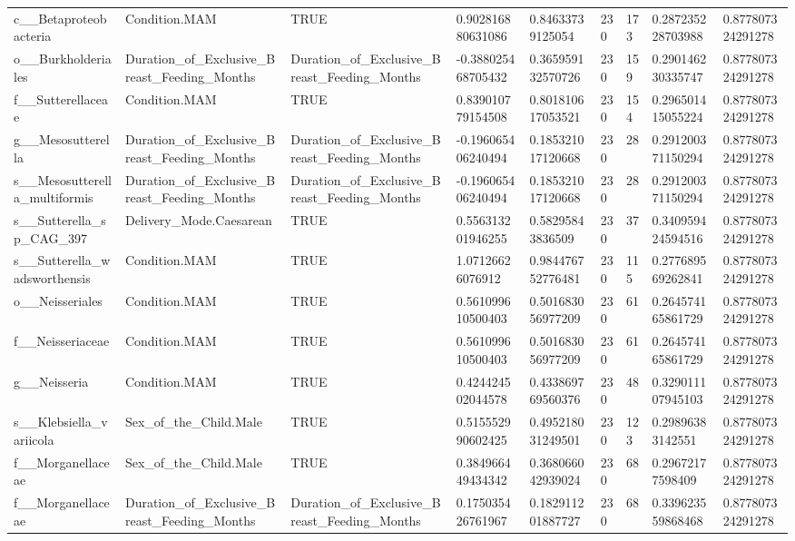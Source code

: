 \begin{longtable}{lllllllll}
c\_\_Betaproteobacteria & Condition.MAM & TRUE & 0.902816880631086 & 0.84633739125054 & 230 & 173 & 0.287235228703988 & 0.877807324291278 \\
o\_\_Burkholderiales & Duration\_of\_Exclusive\_Breast\_Feeding\_Months & Duration\_of\_Exclusive\_Breast\_Feeding\_Months & -0.388025468705432 & 0.365959132570726 & 230 & 159 & 0.290146230335747 & 0.877807324291278 \\
f\_\_Sutterellaceae & Condition.MAM & TRUE & 0.839010779154508 & 0.801810617053521 & 230 & 154 & 0.296501415055224 & 0.877807324291278 \\
g\_\_Mesosutterella & Duration\_of\_Exclusive\_Breast\_Feeding\_Months & Duration\_of\_Exclusive\_Breast\_Feeding\_Months & -0.196065406240494 & 0.185321017120668 & 230 & 28 & 0.291200371150294 & 0.877807324291278 \\
s\_\_Mesosutterella\_multiformis & Duration\_of\_Exclusive\_Breast\_Feeding\_Months & Duration\_of\_Exclusive\_Breast\_Feeding\_Months & -0.196065406240494 & 0.185321017120668 & 230 & 28 & 0.291200371150294 & 0.877807324291278 \\
s\_\_Sutterella\_sp\_CAG\_397 & Delivery\_Mode.Caesarean & TRUE & 0.556313201946255 & 0.58295843836509 & 230 & 37 & 0.340959424594516 & 0.877807324291278 \\
s\_\_Sutterella\_wadsworthensis & Condition.MAM & TRUE & 1.07126626076912 & 0.984476752776481 & 230 & 115 & 0.277689569262841 & 0.877807324291278 \\
o\_\_Neisseriales & Condition.MAM & TRUE & 0.561099610500403 & 0.501683056977209 & 230 & 61 & 0.264574165861729 & 0.877807324291278 \\
f\_\_Neisseriaceae & Condition.MAM & TRUE & 0.561099610500403 & 0.501683056977209 & 230 & 61 & 0.264574165861729 & 0.877807324291278 \\
g\_\_Neisseria & Condition.MAM & TRUE & 0.424424502044578 & 0.433869769560376 & 230 & 48 & 0.329011107945103 & 0.877807324291278 \\
s\_\_Klebsiella\_variicola & Sex\_of\_the\_Child.Male & TRUE & 0.515552990602425 & 0.495218031249501 & 230 & 123 & 0.29896383142551 & 0.877807324291278 \\
f\_\_Morganellaceae & Sex\_of\_the\_Child.Male & TRUE & 0.384966449434342 & 0.368066042939024 & 230 & 68 & 0.29672177598409 & 0.877807324291278 \\
f\_\_Morganellaceae & Duration\_of\_Exclusive\_Breast\_Feeding\_Months & Duration\_of\_Exclusive\_Breast\_Feeding\_Months & 0.175035426761967 & 0.182911201887727 & 230 & 68 & 0.339623559868468 & 0.877807324291278 \\

\end{longtable}
